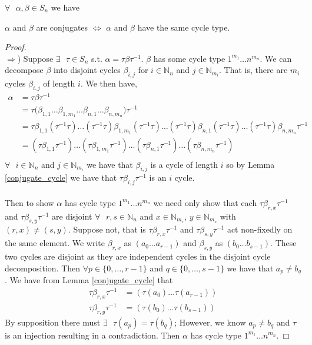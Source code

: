 \begin{theorem}
  \label{conjugate_cycle_type}
  $\forall\text{ }\alpha, \beta \in S_n$ we have
  \begin{center}
    $\alpha$ and $\beta$ are conjugates $\iff$ $\alpha$ and $\beta$
    have the same cycle type.
  \end{center}
\end{theorem}
\begin{proof}
\text{}\\$\Rightarrow$) Suppose $\exists\text{ }\tau\in S_n$ s.t.
$\alpha = \tau\beta\tau^{-1}$. $\beta$ has some cycle type
$1^{m_1}\dots n^{m_n}$. We can decompose
$\beta$ into disjoint cycles $\beta_{i,j}$ for $i\in\mathbb{N}_n$ and
$j\in\mathbb{N}_{m_i}$. That is, there are $m_i$ cycles $\beta_{i,j}$
of length $i$. We then have,
\begin{align*}
  \alpha & = \tau\beta\tau^{-1}
  \\
  & =
  \tau\bigl(\beta_{1,1}\dots\beta_{1,m_1}\dots\beta_{n,1}\dots\beta_{n,m_n}\bigr)\tau^{-1}
  \\
  & =
  \tau\beta_{1,1}(\tau^{-1}\tau)\dots(\tau^{-1}\tau)\beta_{1,m_1}(\tau^{-1}\tau)\dots(\tau^{-1}\tau)\beta_{n,1}(\tau^{-1}\tau)\dots(\tau^{-1}\tau)\beta_{n,m_n}\tau^{-1}
  \\
  & =
  (\tau\beta_{1,1}\tau^{-1})\dots(\tau\beta_{1,m_1}\tau^{-1})\dots(\tau\beta_{n,1}\tau^{-1})\dots(\tau\beta_{n,m_n}\tau^{-1})
  \\
\end{align*}
$\forall\text{ }i \in \mathbb{N}_n$ and $j \in \mathbb{N}_{m_i}$ we
have that $\beta_{i,j}$ is a cycle of length $i$ so
by Lemma \ref{conjugate_cycle} we have that $\tau\beta_{i,
j}\tau^{-1}$ is an $i$ cycle.
\\\\Then to show $\alpha$ has cycle type
$1^{m_1}\dots n^{m_n}$ we need only show that each
$\tau\beta_{r, x}\tau^{-1}$ and $\tau\beta_{s,
y}\tau^{-1}$ are disjoint $\forall\text{ }r,s\in\mathbb{N}_n$ and
$x\in\mathbb{N}_{m_r}$, $y\in\mathbb{N}_{m_s}$ with $(r,x) \ne
(s,y)$. Suppose not, that is
$\tau\beta_{r, x}\tau^{-1}$ and $\tau\beta_{s,
y}\tau^{-1}$ act non-fixedly on the same element. We write
$\beta_{r,x}$ as $(a_0\dots a_{r-1})$ and
$\beta_{s,y}$ as $(b_0\dots b_{s-1})$. These two
cycles are disjoint as they are independent cycles in the disjoint
cycle decomposition. Then $\forall\text{
}p\in\{0,\dots,r-1\}$ and $q\in\{0,\dots,s-1\}$ we
have that $a_p \ne b_q$.
We have from Lemma \ref{conjugate_cycle} that
\begin{align*}
  \tau\beta_{r, x}\tau^{-1} & = (\tau(a_0)\dots\tau(a_{r-1})) \\
  \tau\beta_{r, y}\tau^{-1} & = (\tau(b_0)\dots\tau(b_{s-1}))
\end{align*}
By supposition there must $\exists\text{ }\tau(a_p) = \tau(b_q)$;
However, we know $a_p \ne b_q$ and $\tau$ is an injection resulting in a
contradiction. Then $\alpha$ has cycle type
$1^{m_1}\dots n^{m_n}$.


\end{proof}
